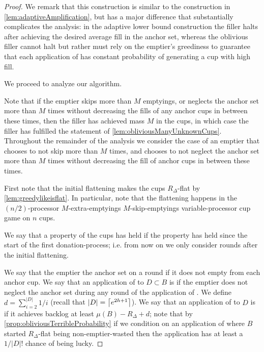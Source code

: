 \begin{proof}
We remark that this construction is similar to the construction
in \cref{lem:adaptiveAmplification}, but has a major difference
that substantially complicates the analysis: in the adaptive
lower bound construction the filler halts after achieving the
desired average fill in the anchor set, whereas the oblivious
filler cannot halt but rather must rely on the emptier's
greediness to guarantee that each application of \randalg has
constant probability of generating a cup with high fill.

We proceed to analyze our algorithm.

Note that if the emptier skips more than $M$ emptyings, or
neglects the anchor set more than $M$ times without decreasing
the fills of any anchor cups in between these times, then the filler has
achieved mass $M$ in the cups, in which case the filler has
fulfilled the statement of \cref{lem:obliviousManyUnknownCups}. 
Throughout the remainder of the analysis we consider the case of an
emptier that chooses to not skip more than $M$ times, and chooses
to not neglect the anchor set more than $M$ times without
decreasing the fill of anchor cups in between these times.

First note that the initial flattening makes the cups
$R_\Delta$-flat by \cref{lem:greedylikeisflat}. In particular,
note that the flattening happens in the $(n/2)$-processor
$M$-extra-emptyings $M$-skip-emptyings variable-processor cup
game on $n$ cups.

We say that a property of the cups has  held if the
property has held since the start of the first donation-process;
i.e. from now on we only consider rounds after the initial
flattening.

We say that the emptier  the anchor set on a round
if it does not empty from each anchor cup. We say that an
application of \randalg to $D\subset B$ is
 if the emptier does not neglect the
anchor set during any round of the application of \randalg. We
define $d = \sum_{i=2}^{|D|} 1/i$ (recall that $|D| =
\left\lceil e^{2h+1} \right\rceil$). We say that an application of \randalg to $D$
is  if it achieves backlog at least $\mu(B) -
R_\Delta + d$; note that by
\cref{prop:obliviousTerribleProbability} if we condition on an
application of \randalg where $B$ started $R_\Delta$-flat being
non-emptier-wasted then the application has at least a $1/|D|!$
chance of being lucky.


\end{proof}
